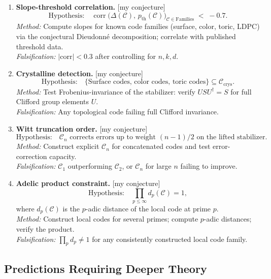 \documentclass[12pt]{article}
\theoremstyle{definition}
\theoremstyle{plain}
\theoremstyle{remark}
\newcommand{\myconj}{{\color{orange}[\textsf{my conjecture}]}}
\newcommand{\cC}{\mathcal{C}}
\begin{document}
\begin{enumerate}[label=\textbf{T\arabic*.},leftmargin=*]

  \item \textbf{Slope-threshold correlation.} \myconj
  \[
  \text{Hypothesis:}\quad
  \operatorname{corr}\bigl(\Delta(\cC),\,p_{\mathrm{th}}(\cC)\bigr)_{\cC\in\text{Families}}
  \;<\; -0.7.
  \]
  \emph{Method:} Compute slopes for known code families (surface, color, toric, LDPC) via the conjectural Dieudonn\'{e} decomposition; correlate with published threshold data.\\
  \emph{Falsification:} $|\text{corr}|<0.3$ after controlling for $n,k,d$.

  \item \textbf{Crystalline detection.} \myconj
  \[
  \text{Hypothesis:}\quad
  \{\text{Surface codes, color codes, toric codes}\}\subseteq\cC_{\mathrm{crys}}.
  \]
  \emph{Method:} Test Frobenius-invariance of the stabilizer: verify $USU^{\dagger}=S$ for full Clifford group elements $U$.\\
  \emph{Falsification:} Any topological code failing full Clifford invariance.

  \item \textbf{Witt truncation order.} \myconj
  \[
  \text{Hypothesis:}\quad
  \cC_n\text{ corrects errors up to weight }(n-1)/2\text{ on the lifted stabilizer}.
  \]
  \emph{Method:} Construct explicit $\cC_n$ for concatenated codes and test error-correction capacity.\\
  \emph{Falsification:} $\cC_1$ outperforming $\cC_2$, or $\cC_n$ for large $n$ failing to improve.

  \item \textbf{Adelic product constraint.} \myconj
  \[
  \text{Hypothesis:}\quad
  \prod_{p\leq\infty} d_p(\cC)=1,
  \]
  where $d_p(\cC)$ is the $p$-adic distance of the local code at prime $p$.\\
  \emph{Method:} Construct local codes for several primes; compute $p$-adic distances; verify the product.\\
  \emph{Falsification:} $\prod_p d_p\neq 1$ for any consistently constructed local code family.

\end{enumerate}

\subsection{Predictions Requiring Deeper Theory}
\end{document}
